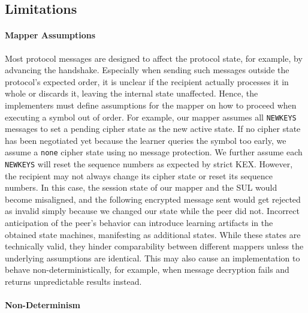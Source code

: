 \subsection{Limitations}
\label{sec:discussion:sub:limitations}

\paragraph{Mapper Assumptions}

Most protocol messages are designed to affect the protocol state, for example, by advancing the handshake. Especially when sending such messages outside the protocol's expected order, it is unclear if the recipient actually processes it in whole or discards it, leaving the internal state unaffected. Hence, the implementers must define assumptions for the mapper on how to proceed when executing a symbol out of order. For example, our mapper assumes all \texttt{NEWKEYS} messages to set a pending cipher state as the new active state. If no cipher state has been negotiated yet because the learner queries the symbol too early, we assume a \texttt{none} cipher state using no message protection. We further assume each \texttt{NEWKEYS} will reset the sequence numbers as expected by strict KEX. However, the recipient may not always change its cipher state or reset its sequence numbers. In this case, the session state of our mapper and the SUL would become misaligned, and the following encrypted message sent would get rejected as invalid simply because we changed our state while the peer did not. Incorrect anticipation of the peer's behavior can introduce learning artifacts in the obtained state machines, manifesting as additional states. While these states are technically valid, they hinder comparability between different mappers unless the underlying assumptions are identical. This may also cause an implementation to behave non-deterministically, for example, when message decryption fails and returns unpredictable results instead.

\paragraph{Non-Determinism}
\label{par:nondeterminism}


